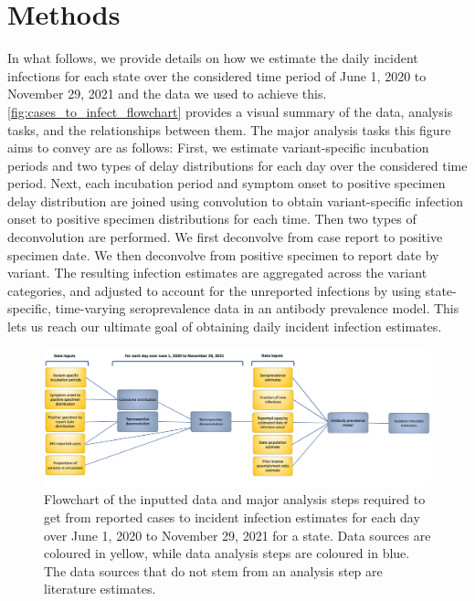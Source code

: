 \documentclass{article}
\begin{document}
\section{Methods}


In what follows, we provide details on how we estimate the daily incident
infections for each state over the considered time period of June 1, 2020 to
November 29, 2021 and the data we used to achieve this. 
\autoref{fig:cases_to_infect_flowchart} provides a visual summary of the data,
analysis tasks, and the relationships between them. The major analysis tasks
this figure aims to convey are as follows: First, we estimate variant-specific
incubation periods and two types of delay distributions for each day over the
considered time period. Next, each incubation period and symptom onset to
positive specimen delay distribution are joined using convolution to obtain
variant-specific infection onset to positive specimen distributions for each
time. Then two types of deconvolution are performed. We first deconvolve from
case report to positive specimen date. We then deconvolve from positive specimen
to report date by variant. The resulting infection estimates are aggregated
across the variant categories, and adjusted to account for the unreported
infections by using state-specific, time-varying seroprevalence data in an
antibody prevalence model. This lets us reach our ultimate goal of obtaining
daily incident infection estimates.


\begin{figure}[!tb]
\centering
    \includegraphics[width=.99\textwidth]{Reported_cases_to_infect_flowchart.pdf} 
    \caption{Flowchart of the inputted data and major analysis steps required 
    to get from reported cases to incident infection estimates for each day 
    over June 1, 2020 to November 29, 2021 for a state. Data sources are coloured 
    in yellow, while data analysis steps are coloured in blue. The data sources that
    do not stem from an analysis step are literature estimates.}
    \label{fig:cases_to_infect_flowchart}
\end{figure}
\end{document}
